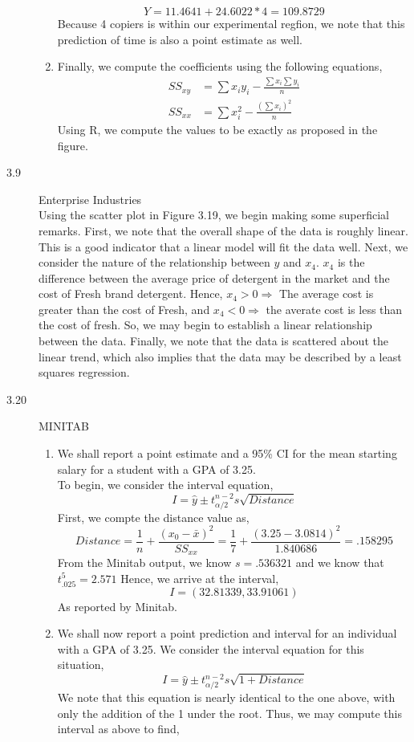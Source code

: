 \documentclass[letterpaper,10pt]{article}
\begin{document}
\begin{description}
\begin{enumerate}[label=\alph*.]
\[Y=11.4641+24.6022*4=109.8729\]
Because 4 copiers is within our experimental regfion, we note that this prediction of time is also a point estimate as well.
\item Finally, we compute the coefficients using the following equations,
\begin{align*}
SS_{xy}&=\sum x_iy_i-\frac{\sum x_i\sum y_i}{n}\\
SS_{xx}&=\sum x_i^2-\frac{(\sum x_i)^2}{n}
\end{align*}
Using R, we compute the values to be exactly as proposed in the figure.
\end{enumerate}
\item[3.9] Enterprise Industries\\
Using the scatter plot in Figure 3.19, we begin making some superficial remarks. First, we note that the overall shape of the data is roughly linear. This is a good indicator that a linear model will fit the data well. Next, we consider the nature of the relationship between $y$ and $x_4$. $x_4$ is the difference between the average price of detergent in the market and the cost of Fresh brand detergent. Hence, $x_4>0\Rightarrow$ The average cost is greater than the cost of Fresh, and $x_4<0\Rightarrow$ the averate cost is less than the cost of fresh. So, we may begin to establish a linear relationship between the data. Finally, we note that the data is scattered about the linear trend, which also implies that the data may be described by a least squares regression.
\item[3.20] MINITAB
\begin{enumerate}[label=\alph*.]
\item We shall report a point estimate and a 95\% CI for the mean starting salary for a student with a GPA of 3.25.\\
To begin, we consider the interval equation,
\[I=\hat{y}\pm t_{\alpha /2}^{n-2}s\sqrt{Distance}\]
First, we compte the distance value as,
\[Distance=\frac{1}{n}+\frac{(x_0-\bar{x})^2}{SS_{xx}}=\frac{1}{7}+\frac{(3.25-3.0814)^2}{1.840686}=.158295\]
From the Minitab output, we know $s=.536321$ and we know that $t_{.025}^{5}=2.571$ Hence, we arrive at the interval,
\[I=(32.81339,33.91061)\]
As reported by Minitab.
\item We shall now report a point prediction and interval for an individual with a GPA of 3.25. We consider the interval equation for this situation,
\[I=\hat{y}\pm t_{\alpha /2}^{n-2}s\sqrt{1+Distance}\]
We note that this equation is nearly identical to the one above, with only the addition of the 1 under the root. Thus, we may compute this interval as above to find,

\end{enumerate}
\end{description}
\end{document}
